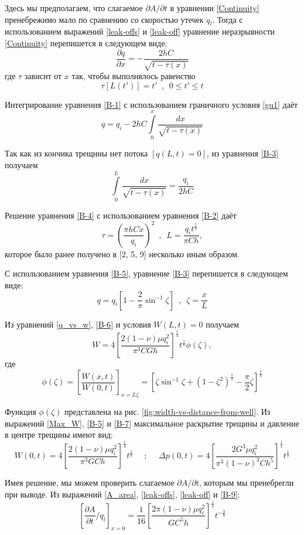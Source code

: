 \documentclass[a4paper, 12pt]{article}
\newcommand{\beq}{\begin{equation}}
\newcommand{\eeq}{\end{equation}}
\begin{document}
Здесь мы предполагаем, что слагаемое $\partial A/\partial t$ в уравнении \eqref{Continuity} пренебрежимо мало по сравнению со скоростью утечек $q_l$.
Тогда с использованием выражений \eqref{leak-offs} и \eqref{leak-off} уравнение неразрывности \eqref{Continuity} перепишется в следующем виде:
\beq\label{B-1}
\frac{\partial q}{\partial x}=-\frac{2hC}{\sqrt{t-\tau(x)}}
\tag{B-1}
\eeq
где $\tau$ зависит от $x$ так, чтобы выполнялось равенство
\beq\label{B-2}
\tau\left[L(t')\right]=t'\,\,\,,\,\,\,0\leqslant t'\leqslant t
\tag{B-2}
\eeq

Интегрирование уравнения \eqref{B-1} с использованием граничного условия \eqref{gu1} даёт
\beq\label{B-3}
q=q_i-2hC\int\limits_{0}^{x}{\frac{dx}{\sqrt{t-\tau(x)}}}
\tag{B-3}
\eeq

Так как из кончика трещины нет потока $\left[q(L,t)=0\right]$, из уравнения \eqref{B-3} получаем
\beq\label{B-4}
\int\limits_{0}^{L}{\frac{dx}{\sqrt{t-\tau(x)}}}=\frac{q_i}{2hC}
\tag{B-4}
\eeq

Решение уравнения \eqref{B-4} с использованием уравнения \eqref{B-2} даёт
\beq\label{B-5}
\tau=\left(\frac{\pi hCx}{q_i}\right)^2\,\,\,,\,\,\,L=\frac{q_it^{\frac{1}{2}}}{\pi Ch},
\tag{B-5}
\eeq
которое было ранее получено в [2, 5, 9] несколько иным образом.

С использованием уравнения \eqref{B-5}, уравнение \eqref{B-3} перепишется в следующем виде:
\beq\label{B-6}
q=q_i\left[1-\frac{2}{\pi}\sin^{-1}{\zeta}\right]\,\,\,,\,\,\,\zeta=\frac{x}{L}
\tag{B-6}
\eeq

Из уравнений \eqref{q_vs_w}, \eqref{B-6} и условия $W(L,t)=0$ получаем
\beq\label{B-7}
W=4\left[\frac{2(1-\nu)\mu q_i^2}{\pi^3 CGh}\right]^{\frac{1}{4}}t^{\frac{1}{8}}\phi(\zeta),
\tag{B-7}
\eeq
где
\beq\label{B-8}
\phi(\zeta)=\left[\frac{W(x,t)}{W(0,t)}\right]_{x=L\zeta}=\left[\zeta\sin^{-1}{\zeta}+(1-\zeta^2)^{\frac{1}{2}}-\frac{\pi}{2}\zeta\right]^{\frac{1}{4}}
\tag{B-8}
\eeq

Функция $\phi(\zeta)$ представлена на рис. \ref{fig:width-vs-distance-from-well}.
Из выражений \eqref{Max_W}, \eqref{B-5} и \eqref{B-7} максимальное раскрытие трещины и давление в центре трещины имеют вид:
\beq\label{B-9}
W(0,t)=4\left[\frac{2(1-\nu)\mu q_i^2}{\pi^3 GCh}\right]^{\frac{1}{4}}t^{\frac{1}{8}}\,\,\,\,\,\,\,\,;\,\,\,\,\,\,\,\,\Delta p(0,t)=4\left[\frac{2G^3\mu q_i^2}{\pi^3(1-\nu)^3 Ch^5}\right]^{\frac{1}{4}}t^{\frac{1}{8}}
\tag{B-9}
\eeq

Имея решение, мы можем проверить слагаемое $\partial A/\partial t$, которым мы пренебрегли при выводе.
Из выражений \eqref{A_area}, \eqref{leak-offs}, \eqref{leak-off} и \eqref{B-9}:
\beq\label{B-10}
\left[\frac{\partial A}{\partial t}/q_l\right]_{x=0}=\frac{1}{16}\left[\frac{2\pi(1-\nu)\mu q_i^2}{GC^5h}\right]^{\frac{1}{4}}t^{-\frac{3}{8}}
\tag{B-10}
\eeq
\end{document}
